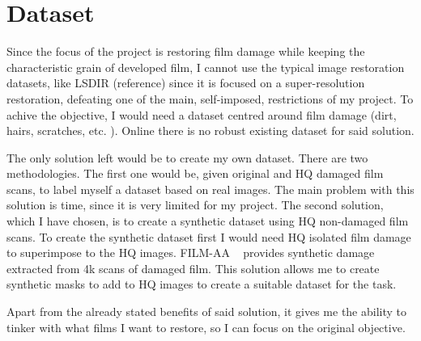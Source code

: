 \documentclass[openany, 12pt]{article}
\begin{document}
	\section{Dataset}
	\label{sec:Dataset}
{\color{blue}Since the focus of the project is restoring film damage while keeping the characteristic grain of developed film, I cannot use the typical image restoration datasets, like LSDIR (reference) since it is focused on a super-resolution restoration, defeating one of the main, self-imposed, restrictions of my project. 
		To achive the objective, I would need a dataset centred around film damage (dirt, hairs, scratches, etc. ). Online there is no robust existing dataset for said solution. 
		
		The only solution left would be to create my own dataset. There are two methodologies. The first one would be, given original and HQ damaged film scans, to label myself a dataset based on real images. The main problem with this solution is time, since it is very limited for my project. The second solution, which I have chosen, is to create a synthetic dataset using HQ non-damaged film scans. To create the synthetic dataset first I would need HQ isolated film damage to superimpose to the HQ images. FILM-AA ~\cite{ivanova23analogue} provides synthetic damage extracted from 4k scans of damaged film. This solution allows me to create synthetic masks to add to HQ images to create a suitable dataset for the task.
		
		Apart from the already stated benefits of said solution, it gives me the ability to tinker with what films I want to restore, so I can focus on the original objective.\\
}
\end{document}
